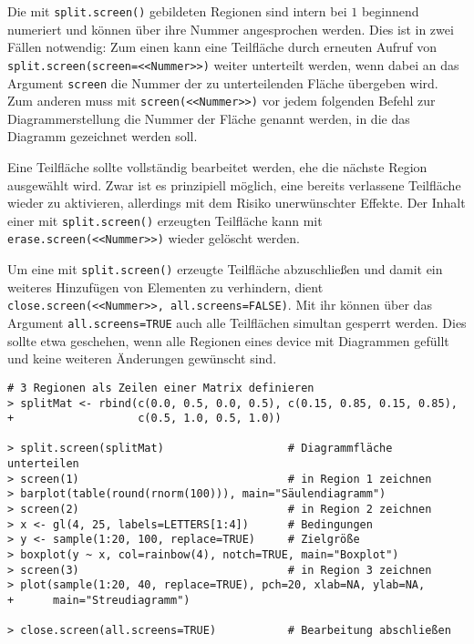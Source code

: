 Die mit \lstinline!split.screen()! gebildeten Regionen sind intern bei $1$ beginnend numeriert und können über ihre Nummer angesprochen werden. Dies ist in zwei Fällen notwendig: Zum einen kann eine Teilfläche durch erneuten Aufruf von \lstinline!split.screen(screen=<<Nummer>>)! weiter unterteilt werden, wenn dabei an das Argument \lstinline!screen! die Nummer der zu unterteilenden Fläche übergeben wird. Zum anderen muss mit \lstinline!screen(<<Nummer>>)! vor jedem folgenden Befehl zur Diagrammerstellung die Nummer der Fläche genannt werden, in die das Diagramm gezeichnet werden soll.

Eine Teilfläche sollte vollständig bearbeitet werden, ehe die nächste Region ausgewählt wird. Zwar ist es prinzipiell möglich, eine bereits verlassene Teilfläche wieder zu aktivieren, allerdings mit dem Risiko unerwünschter Effekte. Der Inhalt einer mit \lstinline!split.screen()! erzeugten Teilfläche kann mit \lstinline!erase.screen(<<Nummer>>)! wieder gelöscht werden.

Um eine mit \lstinline!split.screen()! erzeugte Teilfläche abzuschließen und damit ein weiteres Hinzufügen von Elementen zu verhindern, dient \lstinline!close.screen(<<Nummer>>, all.screens=FALSE)!. Mit ihr können über das Argument \lstinline!all.screens=TRUE! auch alle Teilflächen simultan gesperrt werden. Dies sollte etwa geschehen, wenn alle Regionen eines device mit Diagrammen gefüllt und keine weiteren Änderungen gewünscht sind.
\begin{lstlisting}
# 3 Regionen als Zeilen einer Matrix definieren
> splitMat <- rbind(c(0.0, 0.5, 0.0, 0.5), c(0.15, 0.85, 0.15, 0.85),
+                   c(0.5, 1.0, 0.5, 1.0))

> split.screen(splitMat)                   # Diagrammfläche unterteilen
> screen(1)                                # in Region 1 zeichnen
> barplot(table(round(rnorm(100))), main="Säulendiagramm")
> screen(2)                                # in Region 2 zeichnen
> x <- gl(4, 25, labels=LETTERS[1:4])      # Bedingungen
> y <- sample(1:20, 100, replace=TRUE)     # Zielgröße
> boxplot(y ~ x, col=rainbow(4), notch=TRUE, main="Boxplot")
> screen(3)                                # in Region 3 zeichnen
> plot(sample(1:20, 40, replace=TRUE), pch=20, xlab=NA, ylab=NA,
+      main="Streudiagramm")

> close.screen(all.screens=TRUE)           # Bearbeitung abschließen
\end{lstlisting}
